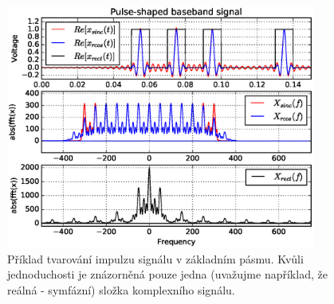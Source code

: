 \begin{figure}[ht]
 \begin{minipage}[c]{0.65\textwidth}
  \includegraphics[width=4in]{./ch_02/img/Pulse_shaping.eps}
 \end{minipage}\hfill
 \begin{minipage}[t]{0.3\textwidth}
  \caption{Příklad tvarování impulzu signálu v základním pásmu. Kvůli jednoduchosti je znázorněná pouze jedna (uvažujme například, že reálná - symfázní) složka komplexního signálu.\label{fig_pulse_shaped}}
 \end{minipage}
\end{figure}

